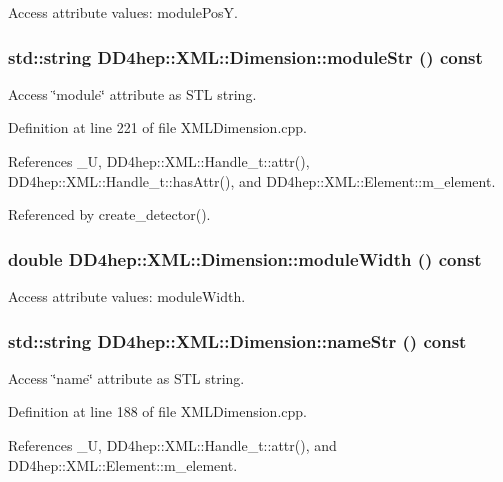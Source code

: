 Access attribute values: modulePosY. \hypertarget{struct_d_d4hep_1_1_x_m_l_1_1_dimension_a97e43369e4a27e1f8210125145fb5ff3}{
\subsubsection[{moduleStr}]{\setlength{\rightskip}{0pt plus 5cm}std::string DD4hep::XML::Dimension::moduleStr () const}}
\label{struct_d_d4hep_1_1_x_m_l_1_1_dimension_a97e43369e4a27e1f8210125145fb5ff3}


Access \char`\"{}module\char`\"{} attribute as STL string. 

Definition at line 221 of file XMLDimension.cpp.

References \_\-U, DD4hep::XML::Handle\_\-t::attr(), DD4hep::XML::Handle\_\-t::hasAttr(), and DD4hep::XML::Element::m\_\-element.

Referenced by create\_\-detector().\hypertarget{struct_d_d4hep_1_1_x_m_l_1_1_dimension_a8b9e5161f6a21a9c936463281e4ffdac}{
\subsubsection[{moduleWidth}]{\setlength{\rightskip}{0pt plus 5cm}double DD4hep::XML::Dimension::moduleWidth () const}}
\label{struct_d_d4hep_1_1_x_m_l_1_1_dimension_a8b9e5161f6a21a9c936463281e4ffdac}


Access attribute values: moduleWidth. \hypertarget{struct_d_d4hep_1_1_x_m_l_1_1_dimension_a6dfa01b86f12435ae2d3fec55404b7cf}{
\subsubsection[{nameStr}]{\setlength{\rightskip}{0pt plus 5cm}std::string DD4hep::XML::Dimension::nameStr () const}}
\label{struct_d_d4hep_1_1_x_m_l_1_1_dimension_a6dfa01b86f12435ae2d3fec55404b7cf}


Access \char`\"{}name\char`\"{} attribute as STL string. 

Definition at line 188 of file XMLDimension.cpp.

References \_\-U, DD4hep::XML::Handle\_\-t::attr(), and DD4hep::XML::Element::m\_\-element.

